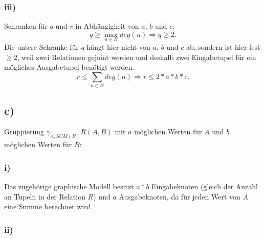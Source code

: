 \documentclass{article}
\begin{document}


\subsubsection*{iii)}
Schranken f\"ur $q$ und $r$ in Abh\"angigkeit von $a$, $b$ und $c$:
$$q \geq \max_{n\in B} deg(n) \Rightarrow q \geq 2.$$
Die untere Schranke f\"ur $q$ h\"angt hier nicht von $a$, $b$ und $c$ ab, sondern ist hier fest $\geq 2$, weil zwei Relationen gejoint werden und deshalb zwei Eingabetupel f\"ur ein m\"ogliches Ausgabetupel ben\"otigt werden.
$$r \leq \sum_{n\in B} deg(n) \Rightarrow r \leq 2*a*b*c.$$

\subsection*{c)}
Gruppierung $\gamma_{A,SUM(B)} R(A, B)$ mit $a$ m\"oglichen Werten
f\"ur $A$ und $b$ m\"oglichen Werten f\"ur $B$:
\subsubsection*{i)}
Das zugeh\"orige graphische Modell besitzt $a* b$ Eingabeknoten (gleich der Anzahl an Tupeln in der Relation $R$) und $a$ Ausgabeknoten, da f\"ur jeden Wert von $A$ eine Summe berechnet wird.
\subsubsection*{ii)}
\end{document}
